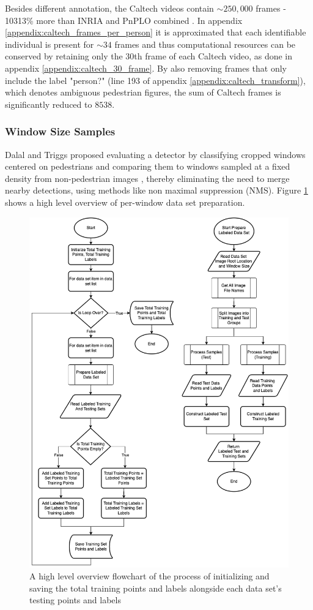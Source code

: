 Besides different annotation, the Caltech videos contain $\sim 250,000$ frames \cite{dollar_2009_pedestrian} - 10313\% more than INRIA and PnPLO combined \cite{karthika_2020_addressing} \cite{dalal_2005_histograms}. In appendix \ref{appendix:caltech_frames_per_person} it is approximated that each identifiable individual is present for $\sim 34$ frames and thus computational resources can be conserved by retaining only the $30$th frame of each Caltech video, as done in appendix \ref{appendix:caltech_30_frame}. By also removing frames that only include the label "person?" (line 193 of appendix \ref{appendix:caltech_transform}), which denotes ambiguous pedestrian figures, the sum of Caltech frames is significantly reduced to $8538$.

\subsubsection{Window Size Samples}

Dalal and Triggs proposed evaluating a detector by classifying cropped windows centered on pedestrians and comparing them to windows sampled at a fixed density from non-pedestrian images \cite{dalal_2005_histograms}, thereby eliminating the need to merge nearby detections, using methods like non maximal suppression (NMS). Figure \ref{fig:dataset_high} shows a high level overview of per-window data set preparation.

\begin{figure}
    \centering
    \includegraphics[width=0.75\linewidth]{images/ee_dataset_high.drawio.png}
    \caption{A high level overview flowchart of the process of initializing and saving the total training points and labels alongside each data set's testing points and labels}
    \label{fig:dataset_high}
\end{figure}

